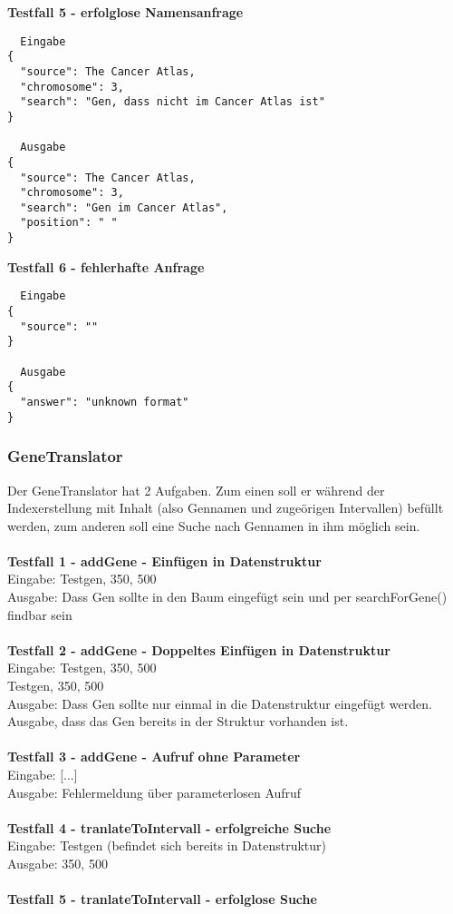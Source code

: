 \documentclass{scrartcl}
\begin{document}
\textbf{Testfall 5 - erfolglose Namensanfrage}
\begin{verbatim}
  Eingabe
{
  "source": The Cancer Atlas,
  "chromosome": 3,
  "search": "Gen, dass nicht im Cancer Atlas ist"
}

  Ausgabe
{
  "source": The Cancer Atlas,
  "chromosome": 3,
  "search": "Gen im Cancer Atlas",
  "position": " "
}
\end{verbatim}
\textbf{Testfall 6 - fehlerhafte Anfrage}
\begin{verbatim}
  Eingabe
{
  "source": ""
}

  Ausgabe
{
  "answer": "unknown format"
}
\end{verbatim}
\newpage
\subsubsection{GeneTranslator}
Der GeneTranslator hat 2 Aufgaben. Zum einen soll er während der Indexerstellung mit Inhalt (also Gennamen und zugeörigen Intervallen) befüllt werden, zum anderen soll eine Suche nach Gennamen in ihm möglich sein.\\
\\
\textbf{Testfall 1 - addGene - Einfügen in Datenstruktur}\\
Eingabe: Testgen, 350, 500\\
Ausgabe: Dass Gen sollte in den Baum eingefügt sein und per searchForGene() findbar sein\\
\\
\textbf{Testfall 2 - addGene - Doppeltes Einfügen in Datenstruktur}\\
Eingabe: Testgen, 350, 500\\
		 Testgen, 350, 500\\
Ausgabe: Dass Gen sollte nur einmal in die Datenstruktur eingefügt werden. Ausgabe, dass das Gen bereits in der Struktur vorhanden ist.\\
\\
\textbf{Testfall 3 - addGene - Aufruf ohne Parameter}\\
Eingabe: [...]\\
Ausgabe: Fehlermeldung über  parameterlosen Aufruf\\
\\
\textbf{Testfall 4 - tranlateToIntervall - erfolgreiche Suche}\\
Eingabe: Testgen (befindet sich bereits in Datenstruktur)\\
Ausgabe: 350, 500\\
\\
\textbf{Testfall 5 - tranlateToIntervall - erfolglose Suche}\\
\end{document}
